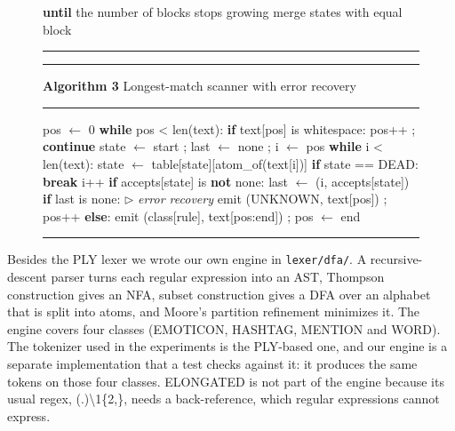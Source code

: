 \documentclass[journal,onecolumn,12pt,a4paper]{IEEEtran}
\begin{document}
\begin{figure}[!t]
\begin{minipage}[t]{0.485\textwidth}
\begin{algorithmic}[1]
\State \hspace*{1.0em}\textbf{until} the number of blocks stops growing
\State \hspace*{1.0em}merge states with equal block
\end{algorithmic}
\hrule
\end{minipage}
\hfill
\begin{minipage}[t]{0.485\textwidth}
\hrule\vspace{2pt}\scriptsize{}\label{alg:3}\textbf{Algorithm 3} Longest-match scanner with error recovery\vspace{2pt}\hrule\vspace{1pt}
\begin{algorithmic}[1]
\State \hspace*{1.0em}pos $\leftarrow$ 0
\State \hspace*{1.0em}\textbf{while} pos \textless{} len(text):
\State \hspace*{2.0em}\textbf{if} text[pos] is whitespace: pos++ ; \textbf{continue}
\State \hspace*{2.0em}state $\leftarrow$ start ; last $\leftarrow$ none ; i $\leftarrow$ pos
\State \hspace*{2.0em}\textbf{while} i \textless{} len(text):
\State \hspace*{3.0em}state $\leftarrow$ table[state][atom\_of(text[i])]
\State \hspace*{3.0em}\textbf{if} state == DEAD: \textbf{break}
\State \hspace*{3.0em}i++
\State \hspace*{3.0em}\textbf{if} accepts[state] is \textbf{not} none:
\State \hspace*{4.0em}last $\leftarrow$ (i, accepts[state])
\State \hspace*{2.0em}\textbf{if} last is none: \hfill{\scriptsize$\triangleright$ \textit{error recovery}}
\State \hspace*{3.0em}emit (UNKNOWN, text[pos]) ; pos++
\State \hspace*{2.0em}\textbf{else}:
\State \hspace*{3.0em}emit (class[rule], text[pos:end]) ; pos $\leftarrow$ end
\end{algorithmic}
\hrule
\end{minipage}
\end{figure}

Besides the PLY lexer we wrote our own engine in \texttt{lexer/\allowbreak{}dfa/\allowbreak{}}. A recursive-descent parser turns each regular expression into an AST, Thompson construction \cite{r5} gives an NFA, subset construction \cite{r6} gives a DFA over an alphabet that is split into atoms, and Moore's partition refinement \cite{r7} minimizes it. The engine covers four classes (EMOTICON, HASHTAG, MENTION and WORD). The tokenizer used in the experiments is the PLY-based one, and our engine is a separate implementation that a test checks against it: it produces the same tokens on those four classes. ELONGATED is not part of the engine because its usual regex, (.)\textbackslash{}1\{2,\}, needs a back-reference, which regular expressions cannot express.
\end{document}
